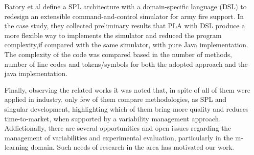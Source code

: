 Batory et al \cite{batory02} define a SPL architecture with a domain-specific language (DSL) to redesign an extensible command-and-control simulator for army fire support. In the case study, they collected preliminary results that PLA with DSL produce a more flexible way to implements the simulator and reduced the program complexity,if compared with the same simulator, with pure Java implementation. The complexity of the code was compared based in the number of methods, number of line codes and tokens/symbols for both the adopted approach and the java implementation.


Finally, observing the related works it was noted that, in spite of all of them were applied in industry, only few of them compare methodologies, as SPL and singular development, highlighting which of them bring more quality and reduces time-to-market, when supported by a variability management approach. Addictionally, there are several opportunities and open issues regarding the management of variabilities and experimental evaluation, particularly in the m-learning domain. Such needs of research in the area has motivated our work.













